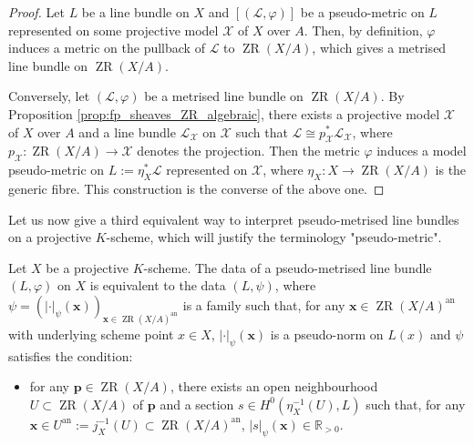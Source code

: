\documentclass [11pt,reqno]{amsart}
\def\bR{{\mathbb{R}}}
\newcommand{\1}{\mathmybb{1}}
\def\cL{{\mathcal{L}}}
\def\cX{{\mathcal{X}}}
\def\an{\operatorname{an}}
\def\ZR{\operatorname{ZR}}
\begin{document}
\begin{proof}
Let $L$ be a line bundle on $X$ and $[(\cL,\varphi)]$ be a pseudo-metric on $L$ represented on some projective model $\cX$ of $X$ over $A$. Then, by definition, $\varphi$ induces a metric on the pullback of $\cL$ to $\ZR(X/A)$, which gives a metrised line bundle on $\ZR(X/A)$.

Conversely, let $(\cL,\varphi)$ be a metrised line bundle on $\ZR(X/A)$. By Proposition \ref{prop:fp_sheaves_ZR_algebraic}, there exists a projective model $\cX$ of $X$ over $A$ and a line bundle $\cL_{\cX}$ on $\cX$ such that $\cL\cong p_{\cX}^{\ast}\cL_{\cX}$, where $p_{\cX}:\ZR(X/A)\to\cX$ denotes the projection. Then the metric $\varphi$ induces a model pseudo-metric on $L:=\eta_{X}^{\ast}\cL$ represented on $\cX$, where $\eta_{X}:X\to \ZR(X/A)$ is the generic fibre. This construction is the converse of the above one.
\end{proof}

Let us now give a third equivalent way to interpret pseudo-metrised line bundles on a projective $K$-scheme, which will justify the terminology "pseudo-metric". 

\begin{proposition}
\label{prop:local_pseudo-metrics_justification_terminology}
Let $X$ be a projective $K$-scheme. The data of a pseudo-metrised line bundle $(L,\varphi)$ on $X$ is equivalent to the data $(L,\psi)$, where $\psi=(|\cdot|_{\psi}(\mathbf{x}))_{\mathbf{x}\in \ZR(X/A)^{\an}}$ is a family such that, for any $\mathbf{x}\in \ZR(X/A)^{\an}$ with underlying scheme point $x\in X$, $|\cdot|_{\psi}(\mathbf{x})$ is a pseudo-norm on $L(x)$ and $\psi$ satisfies the condition:
\begin{itemize}
	\item[($\ast$)] for any $\mathbf{p}\in \ZR(X/A)$, there exists an open neighbourhood $U\subset \ZR(X/A)$ of $\mathbf{p}$ and a section $s\in H^{0}(\eta_{X}^{-1}(U),L)$ such that, for any $\mathbf{x}\in U^{\an}:=j_{X}^{-1}(U) \subset \ZR(X/A)^{\an}$, $|s|_{\psi}(\mathbf{x})\in \bR_{>0}$.
\end{itemize}
\end{proposition}
\end{document}
